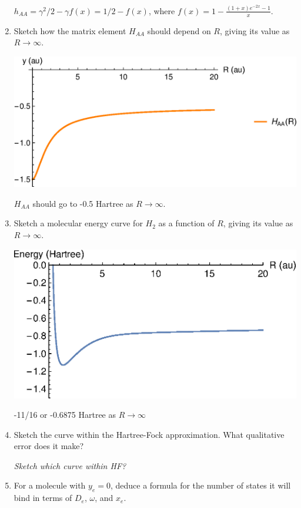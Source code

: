 \documentclass{article}
\begin{document}
\begin{enumerate}
  {\color{blue}
  $h_{AA} = \gamma^2/2 - \gamma f(x) = 1/2 - f(x)$,
  where $f(x) = 1-\frac{(1+x)e^{-2x}-1}{x}$}.
\item Sketch how the matrix element $H_{AA}$ should depend on $R$, giving its
  value as $R\to\infty$.
  \begin{center}
    \includegraphics[scale=0.5]{haa_quiz4.eps}
  \end{center}
  {\color{blue}$H_{AA}$ should go to -0.5 Hartree as $R \rightarrow \infty$.}
\item Sketch a molecular energy curve for $H_2$ as a function of $R$,
  giving its value as $R\to\infty$.
  \begin{center}
    \includegraphics[scale=0.5]{hf_energy.eps}
  \end{center}
  {\color{blue} -11/16 or -0.6875 Hartree as $R\rightarrow \infty$}
\item Sketch the curve within the Hartree-Fock approximation.
  What qualitative error does it make?

  {\color{blue}\textit{Sketch which curve within HF?}}

\item For a molecule with $y_e=0$, deduce a formula for the number of
  states it will bind in terms of $D_e$, $\omega$, and $x_e$.


\end{enumerate}
\end{document}
